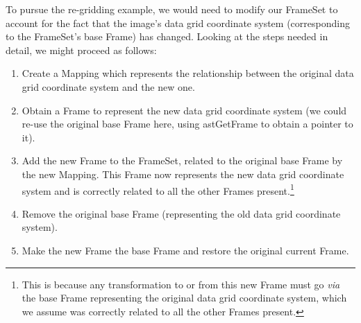 \documentclass[twoside,11pt]{article}
\newcommand{\htmlref}[2]{#1}
\begin{document}
To pursue the re-gridding example, we would need to modify our
FrameSet to account for the fact that the image's data grid coordinate
system (corresponding to the FrameSet's base Frame) has
changed. Looking at the steps needed in detail, we might proceed as
follows:

\begin{enumerate}
\item Create a \htmlref{Mapping}{Mapping} which represents the relationship between the
original data grid coordinate system and the new one.

\item Obtain a Frame to represent the new data grid coordinate system
(we could re-use the original base Frame here, using \htmlref{astGetFrame}{astGetFrame} to
obtain a pointer to it).

\item Add the new Frame to the FrameSet, related to the original base
Frame by the new Mapping. This Frame now represents the new data grid
coordinate system and is correctly related to all the other Frames
present.\footnote{This is because any transformation to or from this
new Frame must go {\em{via}} the base Frame representing the original
data grid coordinate system, which we assume was correctly related to
all the other Frames present.}

\item Remove the original base Frame (representing the old data grid
coordinate system).

\item Make the new Frame the base Frame and restore the original
current Frame.
\end{enumerate}
\end{document}
